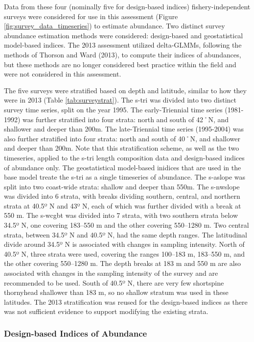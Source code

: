 \documentclass[11pt,
  english,
  letterpaper,
]{article}
\begin{document}
Data from these four (nominally five for design-based indices) fishery-independent surveys were considered for use in this assessment (Figure \ref{fig:survey_data_timeseries}) to estimate abundance. Two distinct survey abundance estimation methods were considered: design-based and geostatistical model-based indices. The 2013 assessment utilized delta-GLMMs, following the methods of Thorson and Ward (2013), to compute their indices of abundances, but these methods are no longer considered best practice within the field and were not considered in this assessment.

The five surveys were stratified based on depth and latitude, similar to how they were in 2013 (Table \ref{tab:surveystrat}). The \gls{s-tri} was divided into two distinct survey time series, split on the year 1995. The early-Triennial time series (1981-1992) was further stratified into four strata: north and south of 42˚N, and shallower and deeper than 200m. The late-Triennial time series (1995-2004) was also further stratified into four strata: north and south of 40˚N, and shallower and deeper than 200m. Note that this stratification scheme, as well as the two timeseries, applied to the \gls{s-tri} length composition data and design-based indices of abundance only. The geostatistical model-based inidices that are used in the base model treate the \gls{s-tri} as a single timeseries of abundance. The \gls{s-aslope} was split into two coast-wide strata: shallow and deeper than 550m. The \gls{s-nwslope} was divided into 6 strata, with breaks dividing southern, central, and northern strata at 40.5º N and 43º N, each of which was further divided with a break at 550 m. The \gls{s-wcgbt} was divided into 7 strata, with two southern strata below 34.5º N, one covering 183--550 m and the other covering 550--1280 m. Two central strata, between 34.5º N and 40.5º N, had the same depth ranges. The latitudinal divide around 34.5º N is associated with changes in sampling intensity. North of 40.5º N, three strata were used, covering the ranges 100--183 m, 183--550 m, and the other covering 550--1280 m. The depth breaks at 183 m and 550 m are also associated with changes in the sampling intensity of the survey and are recommended to be used. South of 40.5º N, there are very few shortspine thornyhead shallower than 183 m, so no shallow stratum was used in these latitudes. The 2013 stratification was reused for the design-based indices as there was not sufficient evidence to support modifying the existing strata.

\hypertarget{design-based-indices-of-abundance}{%
\subsubsection{Design-based Indices of Abundance}\label{design-based-indices-of-abundance}}
\end{document}
